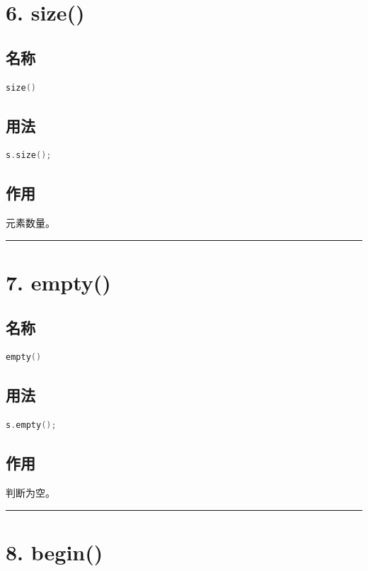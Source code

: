 \documentclass[10pt,twocolumn]{extarticle}
\begin{document}
\section{6. size()}

\subsection{名称}
\begin{lstlisting}[language=C++]
size()
\end{lstlisting}

\subsection{用法}
\begin{lstlisting}[language=C++]
s.size();
\end{lstlisting}

\subsection{作用}
元素数量。

\noindent\rule{\linewidth}{0.4pt}

\section{7. empty()}

\subsection{名称}
\begin{lstlisting}[language=C++]
empty()
\end{lstlisting}

\subsection{用法}
\begin{lstlisting}[language=C++]
s.empty();
\end{lstlisting}

\subsection{作用}
判断为空。

\noindent\rule{\linewidth}{0.4pt}

\section{8. begin()}
\end{document}
